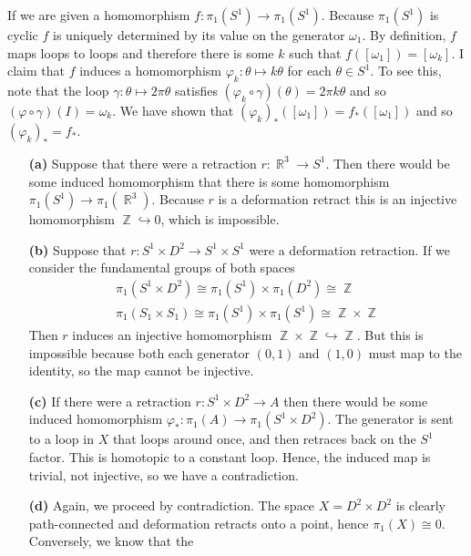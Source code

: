 \documentclass{article}
\DeclareMathOperator{\Z}{\mathbb{Z}}
\DeclareMathOperator{\R}{\mathbb{R}}
\DeclareMathOperator{\into}{\hookrightarrow}
\newcommand{\exercise}[1]{\noindent{\textbf{Exercise #1:}}}
\begin{document}
\exercise{1.1.12}

If we are given a homomorphism $f: \pi_1(S^1) \to \pi_1(S^1)$. Because
$\pi_1(S^1)$ is cyclic $f$ is uniquely determined by its value on the
generator $\omega_1$. By definition, $f$ maps loops to loops and
therefore there is some $k$ such that $f([\omega_1]) = [\omega_k]$. I
claim that $f$ induces a homomorphism $\varphi_k: \theta \mapsto
k\theta$ for each $\theta \in S^1$. To see this, note that the loop
$\gamma: \theta \mapsto 2\pi \theta$ satisfies $(\varphi_k \circ
\gamma)(\theta) = 2\pi k\theta$ and so $(\varphi \circ \gamma)(I) =
\omega_k$. We have shown that $(\varphi_k)_*([\omega_1]) =
f_*([\omega_1])$ and so $(\varphi_k)_* = f_*$.

\exercise{1.1.16}

\begin{enumerate}
\item[\textbf{(a)}] Suppose that there were a retraction $r: \R^3 \to
  S^1$. Then there would be some induced homomorphism that there is
  some homomorphism $\pi_1(S^1) \to \pi_1(\R^3)$. Because $r$ is a
  deformation retract this is an injective homomorphism $\Z
  \into 0$, which is impossible.
\item[\textbf{(b)}] Suppose that $r: S^1 \times D^2 \to S^1 \times
  S^1$ were a deformation retraction. If we consider the fundamental
  groups of both spaces
  \begin{align*}
    \pi_1(S^1 \times D^2) \cong \pi_1(S^1) \times \pi_1(D^2) \cong \Z \\
    \pi_1(S_1 \times S_1) \cong \pi_1(S^1) \times \pi_1(S^1) \cong \Z
    \times \Z
  \end{align*}
  Then $r$ induces an injective homomorphism $\Z \times \Z \into
  \Z$. But this is impossible because both each generator $(0,1)$ and
  $(1,0)$ must map to the identity, so the map cannot be injective.
\item[\textbf{(c)}] If there were a retraction $r: S^1 \times D^2 \to
  A$ then there would be some induced homomorphism $\varphi_*:
  \pi_1(A) \to \pi_1(S^1 \times D^2)$. The generator is sent to a loop
  in $X$ that loops around once, and then retraces back on the $S^1$
  factor. This is homotopic to a constant loop. Hence, the induced map
  is trivial, not injective, so we have a contradiction.
\item[\textbf{(d)}] Again, we proceed by contradiction. The space $X =
  D^2 \times D^2$ is clearly path-connected and deformation retracts
  onto a point, hence $\pi_1(X) \cong 0$. Conversely, we know that the

\end{enumerate}
\end{document}
